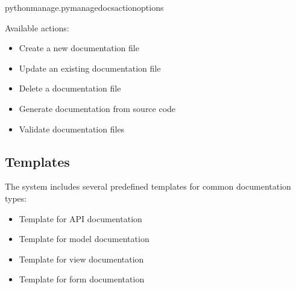 \documentclass[letterpaper,10pt,english]{sphinxmanual}
\begin{document}
\begin{sphinxVerbatim}[commandchars=\\\{\}]
pythonmanage.pymanage\PYGZus{}docs\PYG{o}{[}action\PYG{o}{]}\PYG{o}{[}options\PYG{o}{]}
\end{sphinxVerbatim}

\sphinxAtStartPar
Available actions:
\begin{itemize}
\item {} 
\sphinxAtStartPar
{} \sphinxhyphen{} Create a new documentation file

\item {} 
\sphinxAtStartPar
{} \sphinxhyphen{} Update an existing documentation file

\item {} 
\sphinxAtStartPar
{} \sphinxhyphen{} Delete a documentation file

\item {} 
\sphinxAtStartPar
{} \sphinxhyphen{} Generate documentation from source code

\item {} 
\sphinxAtStartPar
{} \sphinxhyphen{} Validate documentation files

\end{itemize}


\subsection{Templates}
\label{\detokenize{documentation_tools:templates}}
\sphinxAtStartPar
The system includes several pre\sphinxhyphen{}defined templates for common documentation types:
\begin{itemize}
\item {} 
\sphinxAtStartPar
{} \sphinxhyphen{} Template for API documentation

\item {} 
\sphinxAtStartPar
{} \sphinxhyphen{} Template for model documentation

\item {} 
\sphinxAtStartPar
{} \sphinxhyphen{} Template for view documentation

\item {} 
\sphinxAtStartPar
{} \sphinxhyphen{} Template for form documentation

\end{itemize}
\end{document}
